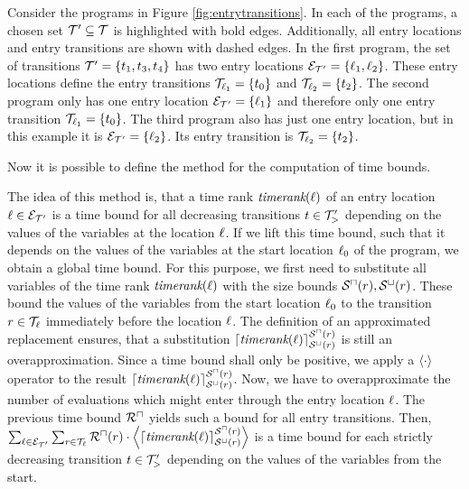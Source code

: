 \begin{example}
  
  Consider the programs in Figure \ref{fig:entrytransitions}.
  In each of the programs, a chosen set $\mathcal{T}' \subseteq \mathcal{T}$ is highlighted with bold edges.
  Additionally, all entry locations and entry transitions are shown with dashed edges.
  In the first program, the set of transitions $\mathcal{T}' = \lbrace t_1, t_3, t_4 \rbrace$ has two entry locations $\mathcal{E}_{\mathcal{T}'} = \lbrace \ell_1, \ell_2 \rbrace$.
  These entry locations define the entry transitions $\mathcal{T}_{\ell_1} = \lbrace t_0 \rbrace$ and $\mathcal{T}_{\ell_2} = \lbrace t_2 \rbrace$.
  The second program only has one entry location $\mathcal{E}_{\mathcal{T}'} = \lbrace \ell_1 \rbrace$ and therefore only one entry transition $\mathcal{T}_{\ell_1} = \lbrace t_0 \rbrace$.
  The third program also has just one entry location, but in this example it is $\mathcal{E}_{\mathcal{T}'} = \lbrace \ell_2 \rbrace$.
  Its entry transition is $\mathcal{T}_{\ell_2} = \lbrace t_2 \rbrace$.
\end{example}

Now it is possible to define the method for the computation of time bounds.



The idea of this method is, that a time rank $\emph{timerank}(\ell)$ of an entry location $\ell \in \mathcal{E}_{\mathcal{T}'}$ is a time bound for all decreasing transitions $t \in \mathcal{T}'_>$ depending on the values of the variables at the location $\ell$.
If we lift this time bound, such that it depends on the values of the variables at the start location $\ell_0$ of the program, we obtain a global time bound.
For this purpose, we first need to substitute all variables of the time rank $\emph{timerank}(\ell)$ with the size bounds ${\mathcal{S}^\sqcap}(r), {\mathcal{S}^\sqcup}(r)$.
These bound the values of the variables from the start location $\ell_0$ to the transition $r \in \mathcal{T}_{\ell}$ immediately before the location $\ell$.
The definition of an approximated replacement ensures, that a substitution $\left\lceil \emph{timerank}(\ell) \right\rceil^{{\mathcal{S}^\sqcap}(r)}_{{\mathcal{S}^\sqcup}(r)}$ is still an overapproximation. 
Since a time bound shall only be positive, we apply a $\left\langle \cdot \right\rangle$ operator to the result $\left\lceil \emph{timerank}(\ell) \right\rceil^{{\mathcal{S}^\sqcap}(r)}_{{\mathcal{S}^\sqcup}(r)}$.
Now, we have to overapproximate the number of evaluations which might enter through the entry location $\ell$.
The previous time bound ${\mathcal{R}^\sqcap}$ yields such a bound for all entry transitions.
Then, $\sum_{\ell \in \mathcal{E}_{\mathcal{T}'}} \sum_{r \in \mathcal{T}_\ell} {\mathcal{R}^\sqcap}(r) \cdot \left\langle \left\lceil \emph{timerank}(\ell) \right\rceil^{{\mathcal{S}^\sqcap}(r)}_{{\mathcal{S}^\sqcup}(r)} \right\rangle$ is a time bound for each strictly decreasing transition $t \in \mathcal{T}'_>$ depending on the values of the variables from the start.

